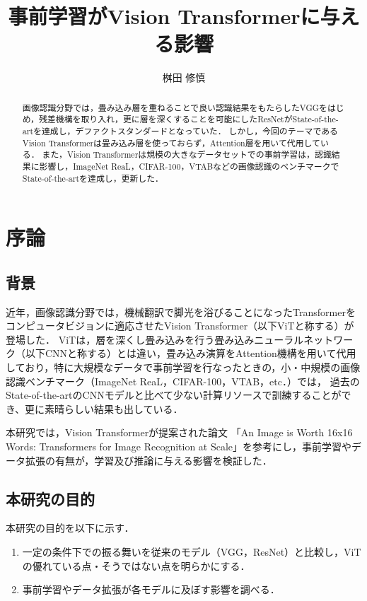 \documentclass[a4paper, oneside, openany, dvipdfmx]{suribt}%
\title{事前学習がVision Transformerに与える影響}
\author{桝田 修慎}
\begin{document}
\maketitle%

\frontmatter%
\begin{abstract}%
画像認識分野では，畳み込み層を重ねることで良い認識結果をもたらしたVGGをはじめ，残差機構を取り入れ，更に層を深くすることを可能にしたResNetがState-of-the-artを達成し，デファクトスタンダードとなっていた．
しかし，今回のテーマであるVision Transformerは畳み込み層を使っておらず，Attention層を用いて代用している．
また，Vision Transformerは規模の大きなデータセットでの事前学習は，認識結果に影響し，ImageNet ReaL，CIFAR-100，VTABなどの画像認識のベンチマークでState-of-the-artを達成し，更新した．


\end{abstract}

\setcounter{tocdepth}{2}
\tableofcontents%

\mainmatter%
\chapter{序論}
\section{背景}
近年，画像認識分野では，機械翻訳で脚光を浴びることになったTransformer\cite{vaswani2017attention}をコンピュータビジョンに適応させたVision Transformer（以下ViTと称する）が登場した\cite{dosovitskiy2021image}．
ViTは，層を深くし畳み込みを行う畳み込みニューラルネットワーク（以下CNNと称する）とは違い，畳み込み演算をAttention機構を用いて代用しており，特に大規模なデータで事前学習を行なったときの，小・中規模の画像認識ベンチマーク（ImageNet ReaL，CIFAR-100，VTAB，etc．）では，
過去のState-of-the-artのCNNモデルと比べて少ない計算リソースで訓練することができ、更に素晴らしい結果も出している．

本研究では，Vision Transformerが提案された論文
「An Image is Worth 16x16 Words: Transformers for Image Recognition at Scale」を参考にし，事前学習やデータ拡張の有無が，学習及び推論に与える影響を検証した．
\section{本研究の目的}
本研究の目的を以下に示す．
\begin{enumerate}
  \item 一定の条件下での振る舞いを従来のモデル（VGG，ResNet）と比較し，ViTの優れている点・そうではない点を明らかにする．
  \item 事前学習やデータ拡張が各モデルに及ぼす影響を調べる．
\end{enumerate}
\end{document}
